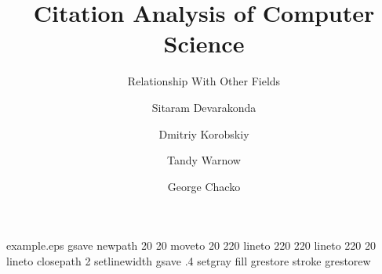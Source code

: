 %
%
%
%
%
\begin{filecontents*}{example.eps}
gsave
newpath
  20 20 moveto
  20 220 lineto
  220 220 lineto
  220 20 lineto
closepath
2 setlinewidth
gsave
  .4 setgray fill
grestore
stroke
grestorew
\end{filecontents*}
%
\RequirePackage{fix-cm}
%
\documentclass[smallextended]{svjour3}       %
%
\smartqed  %
%
\usepackage{graphicx}
%
%
%
%
%


\title{Citation Analysis of Computer Science%
}
\subtitle{Relationship With Other Fields}


\author{Sitaram Devarakonda  \and
	Dmitriy Korobskiy \and
        Tandy Warnow \and
        George Chacko }


